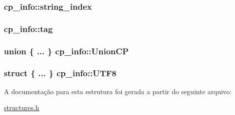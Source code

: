 \subsubsection[{\texorpdfstring{string\+\_\+index}{string_index}}]{ cp\+\_\+info\+::string\+\_\+index}\hypertarget{structcp__info_ae760e12a2ee01b0ace3d35170ca07981}{}\label{structcp__info_ae760e12a2ee01b0ace3d35170ca07981}
\subsubsection[{\texorpdfstring{tag}{tag}}]{ cp\+\_\+info\+::tag}\hypertarget{structcp__info_a045b8801a6e96a2a31d3b62ea684f141}{}\label{structcp__info_a045b8801a6e96a2a31d3b62ea684f141}
\subsubsection[{\texorpdfstring{Union\+CP}{UnionCP}}]{\setlength{\rightskip}{0pt plus 5cm}union \{ ... \}  cp\+\_\+info\+::\+Union\+CP}\hypertarget{structcp__info_aad04019f28f2b6191ace6ab762e051a5}{}\label{structcp__info_aad04019f28f2b6191ace6ab762e051a5}
\subsubsection[{\texorpdfstring{U\+T\+F8}{UTF8}}]{\setlength{\rightskip}{0pt plus 5cm}struct \{ ... \}   cp\+\_\+info\+::\+U\+T\+F8}\hypertarget{structcp__info_a3a9e08ded40cde605289d41a69978159}{}\label{structcp__info_a3a9e08ded40cde605289d41a69978159}


A documentação para esta estrutura foi gerada a partir do seguinte arquivo\+:\begin{DoxyCompactItemize}
\item 
\hyperlink{structures_8h}{structures.\+h}\end{DoxyCompactItemize}
